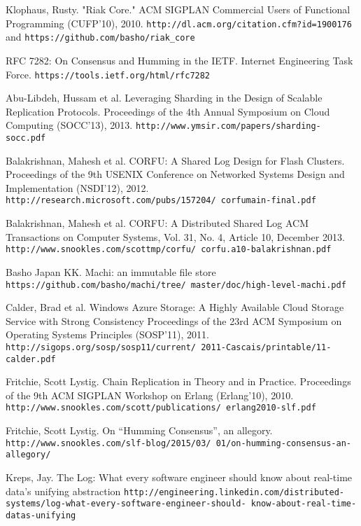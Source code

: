 \documentclass[preprint,10pt]{sigplanconf}
\begin{document}

\begin{thebibliography}{}
\softraggedright

Klophaus, Rusty.
"Riak Core."
ACM SIGPLAN Commercial Users of Functional Programming (CUFP'10), 2010.
{\tt http://dl.acm.org/citation.cfm?id=1900176} and
{\tt https://github.com/basho/riak\_core}

RFC 7282: On Consensus and Humming in the IETF.
Internet Engineering Task Force.
{\tt https://tools.ietf.org/html/rfc7282}

Abu-Libdeh, Hussam et al.
Leveraging Sharding in the Design of Scalable Replication Protocols.
Proceedings of the 4th Annual Symposium on Cloud Computing (SOCC'13), 2013.
{\tt http://www.ymsir.com/papers/sharding-socc.pdf}

Balakrishnan, Mahesh et al.
CORFU: A Shared Log Design for Flash Clusters.
Proceedings of the 9th USENIX Conference on Networked Systems Design
and Implementation (NSDI'12), 2012.
{\tt http://research.microsoft.com/pubs/157204/ corfumain-final.pdf}

Balakrishnan, Mahesh et al.
CORFU: A Distributed Shared Log
ACM Transactions on Computer Systems, Vol. 31, No. 4, Article 10, December 2013.
{\tt http://www.snookles.com/scottmp/corfu/ corfu.a10-balakrishnan.pdf}

Basho Japan KK.
Machi: an immutable file store
{\tt https://github.com/basho/machi/tree/ master/doc/high-level-machi.pdf}

Calder, Brad et al.
Windows Azure Storage: A Highly Available Cloud Storage Service with Strong Consistency
Proceedings of the 23rd ACM Symposium on Operating Systems Principles (SOSP'11), 2011.
{\tt http://sigops.org/sosp/sosp11/current/ 2011-Cascais/printable/11-calder.pdf}

Fritchie, Scott Lystig.
Chain Replication in Theory and in Practice.
Proceedings of the 9th ACM SIGPLAN Workshop on Erlang (Erlang'10), 2010.
{\tt http://www.snookles.com/scott/publications/ erlang2010-slf.pdf}

Fritchie, Scott Lystig.
On “Humming Consensus”, an allegory.
{\tt http://www.snookles.com/slf-blog/2015/03/ 01/on-humming-consensus-an-allegory/}

Kreps, Jay.
The Log: What every software engineer should know about real-time data's unifying abstraction
{\tt http://engineering.linkedin.com/distributed-
  systems/log-what-every-software-engineer-should-
  know-about-real-time-datas-unifying}


\end{thebibliography}
\end{document}
